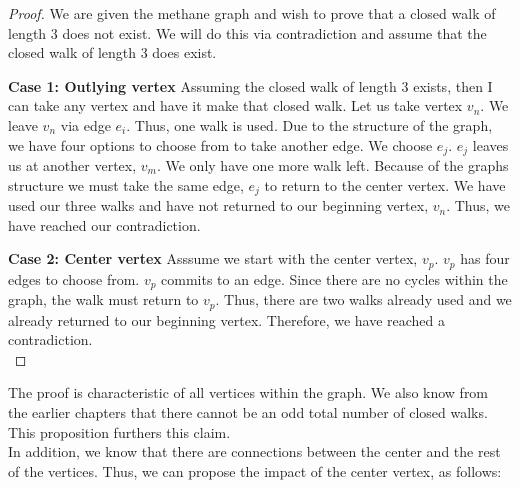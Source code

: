 \begin{proof}
    We are given the methane graph and wish to prove that a closed walk of length 3 does not exist.  We will do this via contradiction and assume that the closed walk of length 3 does exist.  \par \textbf{Case 1: Outlying vertex} Assuming the closed walk of length 3 exists, then I can take any vertex and have it make that closed walk.  Let us take vertex ${v_n}$.  We leave ${v_n}$ via edge ${e_i}$.  Thus, one walk is used.  Due to the structure of the graph, we have four options to choose from to take another edge.  We choose ${e_j}$.  ${e_j}$ leaves us at another vertex, ${v_m}$.  We only have one more walk left.  Because of the graphs structure we must take the same edge, ${e_j}$ to return to the center vertex.  We have used our three walks and have not returned to our beginning vertex, ${v_n}$.  Thus, we have reached our contradiction. \par \textbf{Case 2: Center vertex} Asssume we start with the center vertex, ${v_p}$. ${v_p}$ has four edges to choose from.  ${v_p}$ commits to an edge.  Since there are no cycles within the graph, the walk must return to ${v_p}$.  Thus, there are two walks already used and we already returned to our beginning vertex.  Therefore, we have reached a contradiction. \\
\end{proof}
The proof is characteristic of all vertices within the graph.  We also know from the earlier chapters that there cannot be an odd total number of closed walks. This proposition furthers this claim. 
\\ In addition, we know that there are connections between the center and the rest of the vertices.  Thus, we can propose the impact of the center vertex, as follows:

